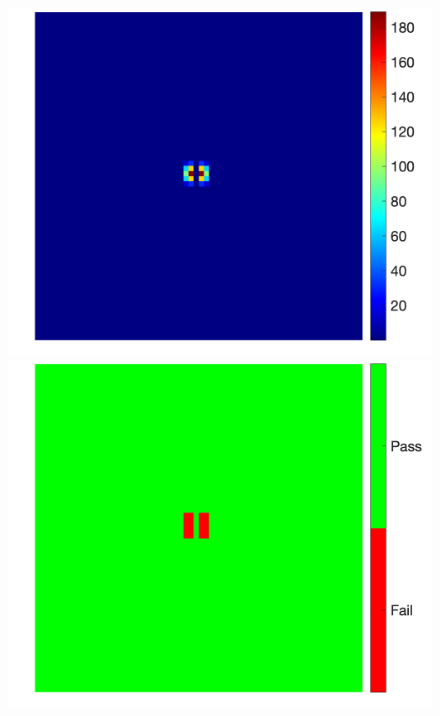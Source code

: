 \documentclass[fleqn,a4paper,oneside,openany]{book}
\begin{document}
\begin{figure}[!t]
\begin{minipage}[b]{0.45\textwidth}
   \end{minipage}
      \begin{minipage}[b]{0.45\textwidth}
     \centering
     \includegraphics[trim = 0 0 0 0, clip, scale=0.40]{example_3a1_diff.png}
   \end{minipage}
   \begin{minipage}[b]{0.45\textwidth}
     \centering
     \includegraphics[trim = 0 0 0 0, clip, scale=0.40]{example_3a1_GM.png}

\end{minipage}
\end{figure}
\end{document}
